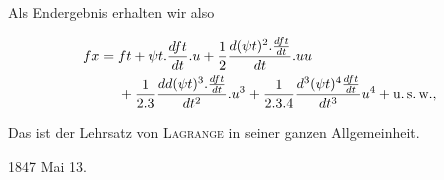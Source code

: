 %

Als Endergebnis erhalten wir also

\[\begin{aligned}
fx={}&ft+\psi t\mathord{.}\frac{dft}{dt}\mathord{.}u
+\frac{1}{2}\frac{d(\psi t)^2\mathord{.}\frac{dft}{dt}}{dt}\mathord{.}uu\\
&+\frac{1}{2.3}\frac{dd(\psi t)^3\mathord{.}\frac{dft}{dt}}{dt^2}\mathord{.}u^3
+\frac{1}{2.3.4}\frac{d^3(\psi t)^4\frac{dft}{dt}}{dt^3}u^4+\text{u.\,s.\,w.},
\end{aligned}\]

\noindent Das ist der Lehrsatz von \textsc{Lagrange} in seiner ganzen Allgemeinheit.

1847 Mai 13.
